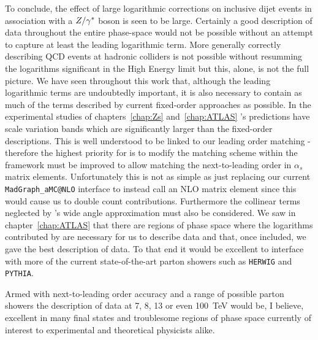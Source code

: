 To conclude, the effect of large logarithmic corrections on inclusive dijet events in association
with a $Z/\gamma^*$ boson is seen to be large.  Certainly a good description of data throughout the entire
phase-space would not be possible without an attempt to capture at least the leading logarithmic term.
More generally correctly describing QCD events at hadronic colliders is not possible without resumming
the logarithms significant in the High Energy limit but this, alone, is not the full picture.  We have
seen throughout this work that, although the leading logarithmic terms are undoubtedly important, it is
also necessary to contain as much of the terms described by current fixed-order approaches as possible.
In the experimental studies of chapters~\ref{chap:Zs} and~\ref{chap:ATLAS} \HEJ's predictions have
scale variation bands which are significantly larger than the fixed-order descriptions.  This is well
understood to be linked to our leading order matching - therefore the highest priority for \hej is to
modify the matching scheme within the \hej framework must be improved to allow matching the next-to-leading
order in $\alpha_s$ matrix elements.  Unfortunately this is not as simple as just replacing our current
\texttt{MadGraph\_aMC@NLO} interface to instead call an NLO matrix element since this would cause us to double
count contributions.  Furthermore the collinear terms neglected by \hej's wide angle approximation must
also be considered.  We saw in chapter~\ref{chap:ATLAS} that there are regions of phase space where the
logarithms contributed by \ARIADNE are necessary for us to describe data and that, once included, we gave
the best description of data.  To that end it would be excellent to interface \HEJ with more of the current
state-of-the-art parton showers such as \texttt{HERWIG} and \texttt{PYTHIA}.

Armed with next-to-leading
order accuracy and a range of possible parton showers the description of data at 7, 8, 13 or even 100~TeV
would be, I believe, excellent in many final states and troublesome regions of phase space currently of
interest to experimental and theoretical physicists alike.


